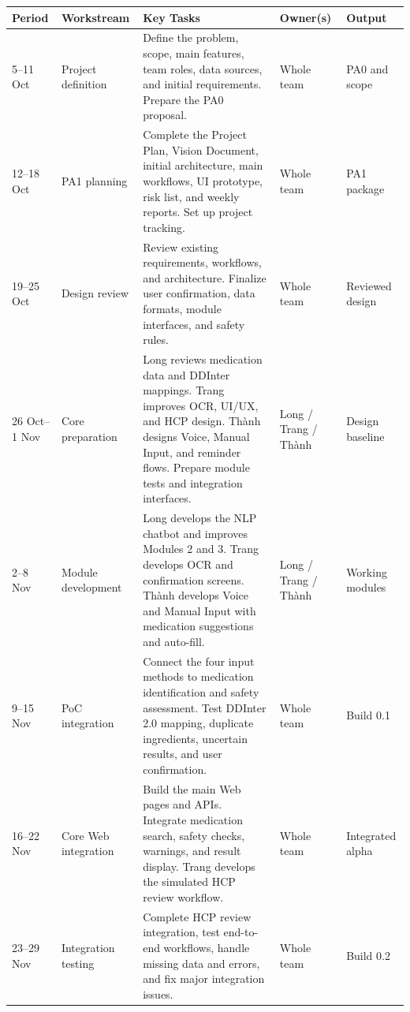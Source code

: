\begin{longtable}{|L{0.14\textwidth}|L{0.16\textwidth}|L{0.34\textwidth}|L{0.14\textwidth}|L{0.10\textwidth}|}
\hline
\textbf{Period} & \textbf{Workstream} &
\textbf{Key Tasks} & \textbf{Owner(s)} &
\textbf{Output}\\ \hline

5--11 Oct
& Project definition
& Define the problem, scope, main features,
team roles, data sources, and initial requirements.
Prepare the PA0 proposal.
& Whole team
& PA0 and scope
\\ \hline

12--18 Oct
& PA1 planning
& Complete the Project Plan, Vision Document,
initial architecture, main workflows, UI prototype,
risk list, and weekly reports. Set up project tracking.
& Whole team
& PA1 package
\\ \hline

19--25 Oct
& Design review
& Review existing requirements, workflows,
and architecture. Finalize user confirmation,
data formats, module interfaces, and safety rules.
& Whole team
& Reviewed design
\\ \hline

26 Oct--1 Nov
& Core preparation
& Long reviews medication data and DDInter mappings.
Trang improves OCR, UI/UX, and HCP design.
Thành designs Voice, Manual Input, and reminder flows.
Prepare module tests and integration interfaces.
& Long / Trang / Thành
& Design baseline
\\ \hline

2--8 Nov
& Module development
& Long develops the NLP chatbot and improves Modules
2 and 3. Trang develops OCR and confirmation screens.
Thành develops Voice and Manual Input with medication
suggestions and auto-fill.
& Long / Trang / Thành
& Working modules
\\ \hline

9--15 Nov
& PoC integration
& Connect the four input methods to medication
identification and safety assessment. Test
DDInter 2.0 mapping, duplicate ingredients,
uncertain results, and user confirmation.
& Whole team
& Build 0.1
\\ \hline

16--22 Nov
& Core Web integration
& Build the main Web pages and APIs.
Integrate medication search, safety checks,
warnings, and result display. Trang develops
the simulated HCP review workflow.
& Whole team
& Integrated alpha
\\ \hline

23--29 Nov
& Integration testing
& Complete HCP review integration, test
end-to-end workflows, handle missing data
and errors, and fix major integration issues.
& Whole team
& Build 0.2
\\ \hline


\end{longtable}
